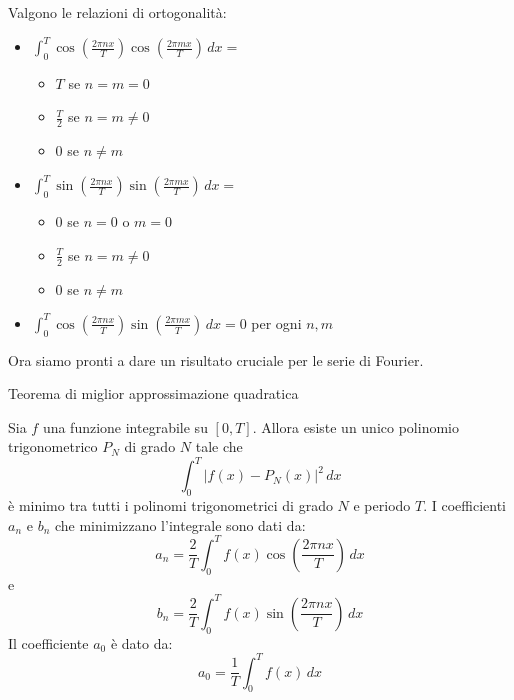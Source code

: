 \begin{osservazione}{}
  Valgono le relazioni di ortogonalità:
  \begin{itemize}
    \item $\int_{0}^{T} \cos\left(\frac{2\pi nx}{T}\right) \cos\left(\frac{2\pi mx}{T}\right) \, dx =$
    \begin{itemize}
      \item $T$ se $n = m = 0$
      \item $\frac{T}{2}$ se $n = m \neq 0$
      \item $0$ se $n \neq m$
    \end{itemize}
    \item $\int_{0}^{T} \sin\left(\frac{2\pi nx}{T}\right) \sin\left(\frac{2\pi mx}{T}\right) \, dx =$
    \begin{itemize}
      \item $0$ se $n = 0$ o $m = 0$
      \item $\frac{T}{2}$ se $n = m \neq 0$
      \item $0$ se $n \neq m$
    \end{itemize}
    \item $\int_{0}^{T} \cos\left(\frac{2\pi nx}{T}\right) \sin\left(\frac{2\pi mx}{T}\right) \, dx = 0$ per ogni $n, m$
  \end{itemize}
\end{osservazione}
Ora siamo pronti a dare un risultato cruciale per le serie di Fourier.

\begin{teorema}{Teorema di miglior approssimazione quadratica}

  Sia $f$ una funzione integrabile su $[0, T]$. Allora esiste un unico polinomio trigonometrico $P_N$ di grado $N$ tale che
  $$
  \int_{0}^{T} \left| f(x) - P_N(x) \right|^2 \, dx
  $$
  è minimo tra tutti i polinomi trigonometrici di grado $N$ e periodo $T$.
  I coefficienti $a_n$ e $b_n$ che minimizzano l'integrale sono dati da:
  $$
  a_n = \frac{2}{T} \int_{0}^{T} f(x) \cos\left(\frac{2\pi nx}{T}\right) \, dx
  $$
  e
  $$
  b_n = \frac{2}{T} \int_{0}^{T} f(x) \sin\left(\frac{2\pi nx}{T}\right) \, dx
  $$
  Il coefficiente $a_0$ è dato da:
  $$
  a_0 = \frac{1}{T} \int_{0}^{T} f(x) \, dx
  $$

\end{teorema}

